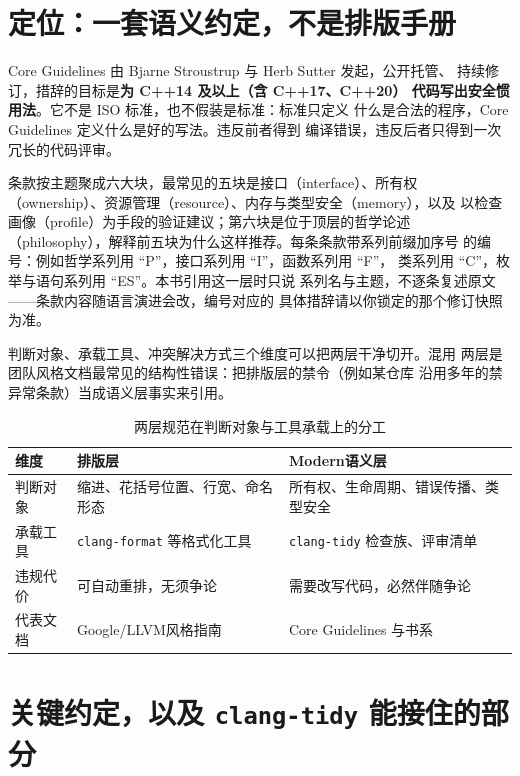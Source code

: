 \documentclass[12pt,a4paper,fontset=fandol]{ctexbook}
\newcommand{\cpp}[1]{C++#1}
\newcommand{\Tp}[1]{\texttt{#1}}
\newcommand{\Bk}{\discretionary{}{}{}}
\newcommand{\Lang}[1]{\textsf{#1}}
\newcommand{\DomGo}{\Lang{Google}}
\newcommand{\DomLlvm}{\Lang{LLVM}}
\newcommand{\DomMod}{\Lang{Modern}}
\begin{document}
\section{定位：一套语义约定，不是排版手册}
\label{sec:ch05-position}

Core Guidelines 由 Bjarne Stroustrup 与 Herb Sutter 发起，公开托管、
持续修订，措辞的目标是\textbf{为 \cpp{14} 及以上（含 \cpp{17}、\cpp{20}）
代码写出安全惯用法}。它不是 ISO 标准，也不假装是标准：标准只定义
什么是合法的程序，Core Guidelines 定义什么是好的写法。违反前者得到
编译错误，违反后者只得到一次冗长的代码评审。

条款按主题聚成六大块，最常见的五块是接口（interface）、所有权
（ownership）、资源管理（resource）、内存与类型安全（memory），以及
以检查画像（profile）为手段的验证建议；第六块是位于顶层的哲学论述
（philosophy），解释前五块为什么这样推荐。每条条款带系列前缀加序号
的编号：例如哲学系列用 ``P''，接口系列用 ``I''，函数系列用 ``F''，
类系列用 ``C''，枚举与语句系列用 ``ES''。本书引用这一层时只说
系列名与主题，不逐条复述原文——条款内容随语言演进会改，编号对应的
具体措辞请以你锁定的那个修订快照为准。

\begin{note}[title={语义层与排版层的分工}]
判断对象、承载工具、冲突解决方式三个维度可以把两层干净切开。混用
两层是团队风格文档最常见的结构性错误：把排版层的禁令（例如某仓库
沿用多年的禁异常条款）当成语义层事实来引用。
\end{note}

\begin{table}[h]
\centering
\begin{tabularx}{\linewidth}{>{\raggedright\arraybackslash}p{}
  >{\raggedright\arraybackslash}X
  >{\raggedright\arraybackslash}X}
\toprule
维度 & 排版层 & \DomMod 语义层 \\
\midrule
判断对象 & 缩进、花括号位置、行宽、命名形态 & 所有权、生命周期、错误传播、类型安全 \\
承载工具 & \Tp{clang-format} 等格式化工具 & \Tp{clang-tidy} 检查族、评审清单 \\
违规代价 & 可自动重排，无须争论 & 需要改写代码，必然伴随争论 \\
代表文档 & \DomGo/{\Bk}\DomLlvm 风格指南 & Core Guidelines 与书系 \\
\bottomrule
\end{tabularx}
\caption{两层规范在判断对象与工具承载上的分工}
\label{tab:ch05-layers}
\end{table}

\section{关键约定，以及 \Tp{clang-tidy} 能接住的部分}
\label{sec:ch05-conventions}
\end{document}
